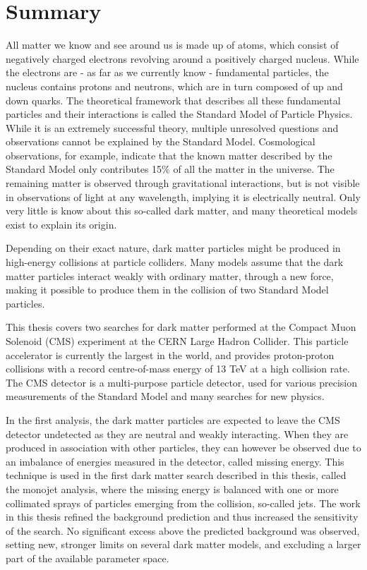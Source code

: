 
\chapter*{Summary}

All matter we know and see around us is made up of atoms, which consist of negatively charged electrons revolving around a positively charged nucleus. While the electrons are - as far as we currently know - fundamental particles, the nucleus contains protons and neutrons, which are in turn composed of up and down quarks. The theoretical framework that describes all these fundamental particles and their interactions is called the Standard Model of Particle Physics.  While it is an extremely successful theory, multiple unresolved questions and observations cannot be explained by the Standard Model. Cosmological observations, for example, indicate that the known matter described by the Standard Model only contributes 15\% of all the matter in the universe. The remaining matter is observed through gravitational interactions, but is not visible in observations of light at any wavelength, implying it is electrically neutral. Only very little is know about this so-called dark matter, and many theoretical models exist to explain its origin.

Depending on their exact nature, dark matter particles might be produced in high-energy collisions at particle colliders. Many models assume that the dark matter particles interact weakly with ordinary matter, through a new force, making it possible to produce them in the collision of two Standard Model particles. 

This thesis covers two searches for dark matter performed at the Compact Muon Solenoid (CMS) experiment at the CERN Large Hadron Collider. This particle accelerator is currently the largest in the world, and provides proton-proton collisions with a record centre-of-mass energy of 13 TeV at a high collision rate. The CMS detector is a multi-purpose particle detector, used for various precision measurements of the Standard Model and many searches for new physics.

In the first analysis, the dark matter particles are expected to leave the CMS detector undetected as they are neutral and weakly interacting. When they are produced in association with other particles, they can however be observed due to an imbalance of energies measured in the detector, called missing energy. This technique is used in the first dark matter search described in this thesis, called the monojet analysis, where the missing energy is balanced with one or more collimated sprays of particles emerging from the collision, so-called jets. The work in this thesis refined the background prediction and thus increased the sensitivity of the search. No significant excess above the predicted background was observed, setting new, stronger limits on several dark matter models, and excluding a larger part of the available parameter space.


